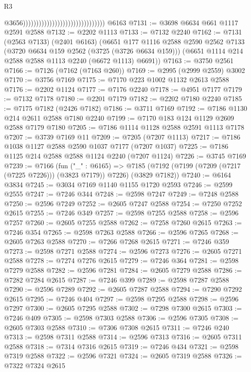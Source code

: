 \begin{lexlean}{R3}
\begin{coremodule}
                                                                  @3656)))))))))))))))))))))))))))))))
    @6163
@7131 := @3698 @6634 @661 @1117 @2591 @2588
@7132 := @2202 @1113
@7133 := @7132 @2240
@7162 := @7131
    (@2563 @7133)
    (@2401 @6163)
    (@6651
      @177
      @1116
      @2588
      @2590
      @2562
      @7133
      (@3720 @6634 @159 @2562 (@3725 (@3726 @6634 @159)))
      (@6651 @1114 @214 @2588 @2588 @1113 @2240 (@6672 @1113) @6691))
@7163 := @3750 @2561
@7166 := @7126 (@7162 (@7163 @260))
@7169 := @2995 (@2999 @2559) @3002
@7170 := @3756 @7169
@7175 := @7170 @223 @1002 @1132 @2613 @2588
@7176 := @2202 @1124
@7177 := @7176 @2240
@7178 := @4951 @7177
@7179 := @7132 @7178
@7180 := @2201 @7179
@7182 := @2202 @7180 @2240
@7185 := @7175 @7182 (@2426 @7182)
@7186 := @3711 @7169
@7192 := @7186 @1130 @214 @2611 @2588 @7180 @2240
@7199 := @7170 @183 @124 @1129 @2609 @2588 @7179 @7180
@7205 := @7186 @1114 @1128 @2588 @2591 @1113 @7178
@7207 := @3739 @7169 @11
@7209 := @7205 (@7207 @1113)
@7217 := @7186 @1038 @1127 @2588 @2590 @1037 @7177 (@7207 @1037)
@7225 := @7186 @1125 @214 @2588 @2588 @1124 @2240 (@7207 @1124)
@7226 := @3745 @7169
@7239 := @7166
    (fun ("_" : @6165) =>
    @7185 (@7192 (@7199 (@7209 (@7217 (@7225 @7226))) (@3823 @7179)) @7226) (@3829 @7182))
@7240 := @6164 @3834
@7245 := @3034 @7169 @1140 @1155 @1720 @2593
@7246 := @2599 @2555
@7247 := @7246 @344
@7248 := @2598 @7247
@7249 := @7248 @2588
@7250 := @2596 @7249
@7252 := @2605 @7247 @2588
@7254 := @7250 @7252 @2615
@7255 := @7246 @349
@7257 := @2598 @7255 @2588
@7258 := @2596 @7257
@7260 := @2605 @7255 @2588
@7262 := @7258 @7260 @2615
@7263 := @7246 @354
@7265 := @2598 @7263 @2588
@7266 := @2596 @7265
@7268 := @2605 @7263 @2588
@7270 := @7266 @7268 @2615
@7271 := @7246 @359
@7273 := @2598 @7271 @2588
@7274 := @2596 @7273
@7276 := @2605 @7271 @2588
@7278 := @7274 @7276 @2615
@7279 := @7246 @364
@7281 := @2598 @7279 @2588
@7282 := @2596 @7281
@7284 := @2605 @7279 @2588
@7286 := @7282 @7284 @2615
@7287 := @7246 @399
@7289 := @2598 @7287 @2588
@7290 := @2596 @7289
@7292 := @2605 @7287 @2588
@7294 := @7290 @7292 @2615
@7295 := @7246 @404
@7297 := @2598 @7295 @2588
@7298 := @2596 @7297
@7300 := @2605 @7295 @2588
@7302 := @7298 @7300 @2615
@7303 := @7246 @409
@7305 := @2598 @7303 @2588
@7306 := @2596 @7305
@7308 := @2605 @7303 @2588
@7310 := @7306 @7308 @2615
@7311 := @7246 @240
@7313 := @2598 @7311 @2588
@7314 := @2596 @7313
@7316 := @2605 @7311 @2588
@7318 := @7314 @7316 @2615
@7319 := @7246 @434
@7321 := @2598 @7319 @2588
@7322 := @2596 @7321
@7324 := @2605 @7319 @2588
@7326 := @7322 @7324 @2615

\end{coremodule}
\end{lexlean}
